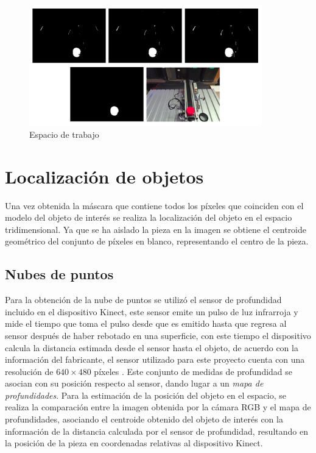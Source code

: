 \begin{figure}[ht]
\centering
\includegraphics[width=0.9\textwidth]{Figures/Masks_WS_3.png}
    \caption{Espacio de trabajo}
    \label{fig:Masks_WorkSpace}
\end{figure}

\section{Localización de objetos}

Una vez obtenida la máscara que contiene todos los píxeles que coinciden con el modelo del objeto de interés se realiza la localización del objeto en el espacio tridimensional. Ya que se ha aislado la pieza en la imagen se obtiene el centroide geométrico del conjunto de píxeles en blanco, representando el centro de la pieza. 


\subsection{Nubes de puntos}

Para la obtención de la nube de puntos se utilizó el sensor de profundidad incluido en el dispositivo Kinect, este sensor emite un pulso de luz infrarroja y mide el tiempo que toma el pulso desde que es emitido hasta que regresa al sensor después de haber rebotado en una superficie, con este tiempo el dispositivo calcula la distancia estimada desde el sensor hasta el objeto, de acuerdo con la información del fabricante, el sensor utilizado para este proyecto cuenta con una resolución de $640 \times 480$ píxeles \cite{davison_kinect_2012}. Este conjunto de medidas de profundidad se asocian con su posición respecto al sensor, dando lugar a un \textit{mapa de profundidades}. Para la estimación de la posición del objeto en el espacio, se realiza la comparación entre la imagen obtenida por la cámara RGB y el mapa de profundidades, asociando el centroide obtenido del objeto de interés con la información de la distancia calculada por el sensor de profundidad, resultando en la posición de la pieza en coordenadas relativas al dispositivo Kinect.
